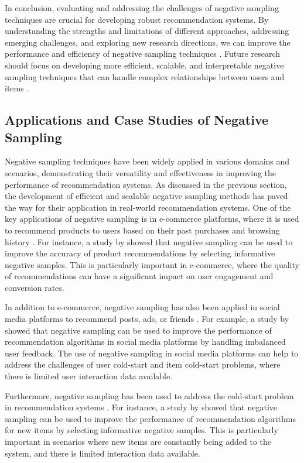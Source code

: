 \documentclass[11pt,a4paper]{article}
\begin{document}
In conclusion, evaluating and addressing the challenges of negative sampling techniques are crucial for developing robust recommendation systems. By understanding the strengths and limitations of different approaches, addressing emerging challenges, and exploring new research directions, we can improve the performance and efficiency of negative sampling techniques \cite{doi:10.1109/tpami.2024.3371473}. Future research should focus on developing more efficient, scalable, and interpretable negative sampling techniques that can handle complex relationships between users and items \cite{doi:10.1145/3511808.3557220}.


\subsection{Applications and Case Studies of Negative Sampling}


Negative sampling techniques have been widely applied in various domains and scenarios, demonstrating their versatility and effectiveness in improving the performance of recommendation systems. As discussed in the previous section, the development of efficient and scalable negative sampling methods has paved the way for their application in real-world recommendation systems. One of the key applications of negative sampling is in e-commerce platforms, where it is used to recommend products to users based on their past purchases and browsing history \cite{doi:10.1609/aaai.v34i01.5329}. For instance, a study by \cite{doi:10.1145/2911451.2911489} showed that negative sampling can be used to improve the accuracy of product recommendations by selecting informative negative samples. This is particularly important in e-commerce, where the quality of recommendations can have a significant impact on user engagement and conversion rates.

In addition to e-commerce, negative sampling has also been applied in social media platforms to recommend posts, ads, or friends \cite{arxiv:1604.06743}. For example, a study by \cite{doi:10.1145/3583780.3614965} showed that negative sampling can be used to improve the performance of recommendation algorithms in social media platforms by handling imbalanced user feedback. The use of negative sampling in social media platforms can help to address the challenges of user cold-start and item cold-start problems, where there is limited user interaction data available.

Furthermore, negative sampling has been used to address the cold-start problem in recommendation systems \cite{doi:10.1109/access.2020.3022796}. For instance, a study by \cite{doi:10.3390/app9091894} showed that negative sampling can be used to improve the performance of recommendation algorithms for new items by selecting informative negative samples. This is particularly important in scenarios where new items are constantly being added to the system, and there is limited interaction data available.
\end{document}
